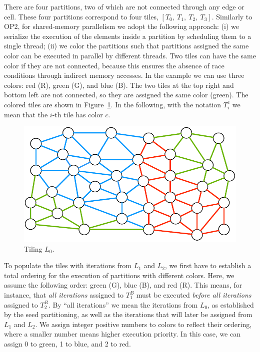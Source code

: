 There are four partitions, two of which are not connected through any edge or cell. These four partitions correspond to four tiles, $[T_0,\ T_1,\ T_2,\ T_3]$. Similarly to OP2, for shared-memory parallelism we adopt the following approach: (i) we serialize the execution of the elements inside a partition by scheduling them to a single thread; (ii) we color the partitions such that partitions assigned the same color can be executed in parallel by different threads. Two tiles can have the same color if they are not connected, because this ensures the absence of race conditions through indirect memory accesses. In the example we can use three colors: red (R), green (G), and blue (B). The two tiles at the top right and bottom left are not connected, so they are assigned the same color (green). The colored tiles are shown in Figure~\ref{fig:st-loop-0}. In the following, with the notation $T_i^c$ we mean that the $i$-th tile has color $c$. 

\begin{figure}[b]
\centering
\includegraphics[scale=0.7]{sparsetiling/figures/loop_0.pdf}
\caption{Tiling $L_0$.}
\label{fig:st-loop-0}
\end{figure}

To populate the tiles with iterations from $L_1$ and $L_2$, we first have to establish a total ordering for the execution of partitions with different colors. Here, we assume the following order: green (G), blue (B), and red (R). This means, for instance, that \textit{all iterations} assigned to $T_1^B$ must be executed \textit{before all iterations} assigned to $T_2^R$. By ``all iterations'' we mean the iterations from $L_0$, as established by the seed partitioning, as well as the iterations that will later be assigned from $L_1$ and $L_2$. We assign integer positive numbers to colors to reflect their ordering, where a smaller number means higher execution priority. In this case, we can assign 0 to green, 1 to blue, and 2 to red.


